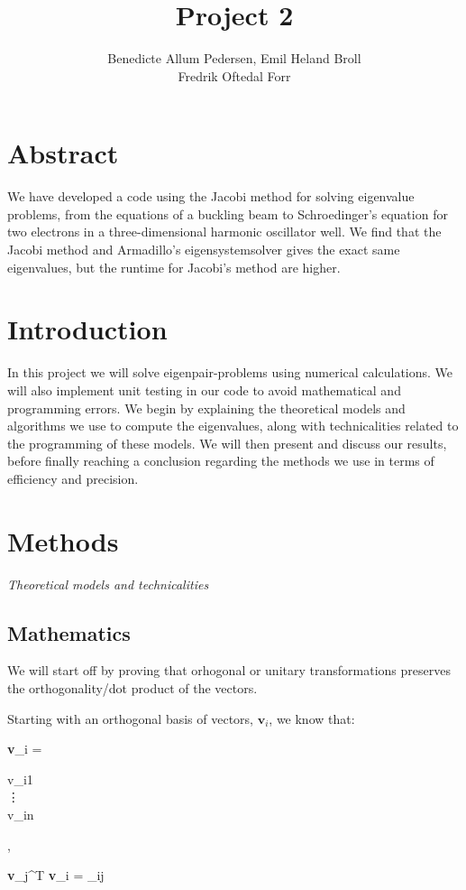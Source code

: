 \documentclass{article}
\title{Project 2}\vspace{-3ex}
\author{Benedicte Allum Pedersen, Emil Heland Broll\\ Fredrik Oftedal Forr}
\date{\vspace{-5ex}}
\begin{document}
\maketitle

\section{Abstract}
	We have developed a code using the Jacobi method for solving eigenvalue problems, from the equations of a buckling beam to Schroedinger's equation for two electrons in a three-dimensional harmonic oscillator well. We find that the Jacobi method and Armadillo's eigensystemsolver gives the exact same eigenvalues, but the runtime for Jacobi's method are higher.

\section{Introduction}
	In this project we will solve eigenpair-problems using numerical calculations. We will also implement unit testing in our code to avoid mathematical and programming errors. We begin by explaining the theoretical models and algorithms we use to compute the eigenvalues,
	along with technicalities related to the programming of these models. We will then present and discuss our results, before finally reaching a conclusion
	regarding the methods we use in terms of efficiency and precision.

\section{Methods}
	\textit{Theoretical models and technicalities}
	\subsection{Mathematics}
		We will start off by proving that orhogonal or unitary transformations preserves
		the orthogonality/dot product of the vectors.

		Starting with an orthogonal basis of vectors, $\textbf{v}_i$, we know that:

		\begin{flalign*}
		\begin{aligned}
			\textbf{v}_i = \begin{bmatrix}
			v_{i1} \\
			\vdots \\
			v_{in}
			\end{bmatrix},
		\end{aligned}
		\qquad
		\begin{aligned}
			\textbf{v}_j^T \textbf{v}_i = \delta_{ij}
		\end{aligned}
		\end{flalign*}
\end{document}
